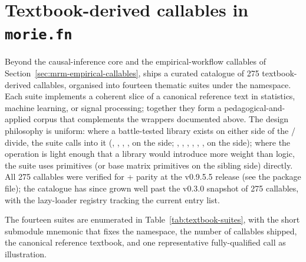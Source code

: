 \documentclass[article,shortnames,nojss]{jss}
\begin{document}
\section[Textbook-derived callables in morie.fn]{Textbook-derived callables in \texttt{morie.fn}}\label{sec:textbook-callables}

Beyond the causal-inference core and the empirical-workflow
callables of Section~\ref{sec:mrm-empirical-callables},
 ships a curated catalogue of 275 textbook-derived
callables, organised into fourteen thematic suites under the
 namespace.  Each suite implements a coherent
slice of a canonical reference text in statistics, machine
learning, or signal processing; together they form a
pedagogical-and-applied corpus that complements the wrappers
documented above.  The design philosophy is uniform: where a
battle-tested library exists on either side of the
/ divide, the suite calls into it
(, , ,
,  on the  side;
, , , ,
, ,  on the
 side); where the operation is light enough that a
library would introduce more weight than logic, the suite uses
 primitives (or base  matrix
primitives on the sibling side) directly.  All 275 callables
were verified for  +  parity at the
v0.9.5.5 release (see the package  file); the
catalogue has since grown well past the v0.3.0 snapshot of 275
callables, with the lazy-loader registry tracking the current
entry list.

The fourteen suites are enumerated in
Table~\ref{tab:textbook-suites}, with the short submodule
mnemonic that fixes the namespace, the number of callables
shipped, the canonical reference textbook, and one representative
fully-qualified  call as illustration.
\end{document}
